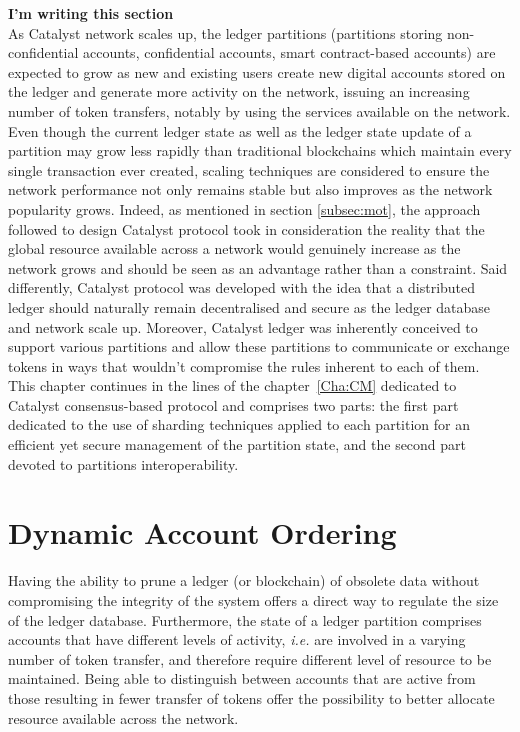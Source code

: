 \textbf{I'm writing this section}\\


As Catalyst network scales up, the ledger partitions (partitions storing non-confidential accounts, confidential accounts, smart contract-based accounts) are expected to grow as new and existing users create new digital accounts stored on the ledger and generate more activity on the network, issuing an increasing number of token transfers, notably by using the services available on the network. Even though the current ledger state as well as the ledger state update of a partition may grow less rapidly than traditional blockchains which maintain every single transaction ever created, scaling techniques are considered to ensure the network performance not only remains stable but also improves as the network popularity grows. Indeed, as mentioned in section \ref{subsec:mot}, the approach followed to design Catalyst protocol took in consideration the reality that the global resource available across a network would genuinely increase as the network grows and should be seen as an advantage rather than a constraint. Said differently, Catalyst protocol was developed with the idea that a distributed ledger should naturally remain decentralised and secure as the ledger database and network scale up. Moreover, Catalyst ledger was inherently conceived to support various partitions and allow these partitions to communicate or exchange tokens in ways that wouldn't compromise the rules inherent to each of them. \\

This chapter continues in the lines of the chapter~\ref{Cha:CM} dedicated to Catalyst consensus-based protocol and comprises two parts: the first part dedicated to the use of sharding techniques applied to each partition for an efficient yet secure management of the partition state, and the second part devoted to partitions interoperability. %

\section{Dynamic Account Ordering}
Having the ability to prune a ledger (or blockchain) of obsolete data without compromising the integrity of the system offers a direct way to regulate the size of the ledger database. Furthermore, the state of a ledger partition comprises accounts that have different levels of activity, \textit{i.e.} are involved in a varying number of token transfer, and therefore require different level of resource to be maintained. Being able to distinguish between accounts that are active from those resulting in fewer transfer of tokens offer the possibility to better allocate resource available across the network. \\

